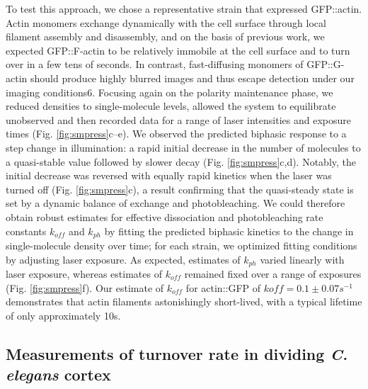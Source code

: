 To test this approach, we chose a representative strain that expressed GFP::actin. Actin monomers exchange dynamically with the cell surface through local filament assembly and disassembly, and on the basis of previous work, we expected GFP::F-actin to be relatively immobile at the cell surface and to turn over in a few tens of seconds. In contrast, fast-diffusing monomers of GFP::G-actin should produce highly blurred images and thus escape detection under our imaging conditions6. Focusing again on the polarity maintenance phase, we reduced densities to single-molecule levels, allowed the system to equilibrate unobserved and then recorded data for a range of laser intensities and exposure times (Fig. \ref{fig:smpress}c–e). We observed the predicted biphasic response to a step change in illumination: a rapid initial decrease in the number of molecules to a quasi-stable value followed by slower decay (Fig. \ref{fig:smpress}c,d). Notably, the initial decrease was reversed with equally rapid kinetics when the laser was turned off (Fig. \ref{fig:smpress}c), a result confirming that the quasi-steady state is set by a dynamic balance of exchange and photobleaching. We could therefore obtain robust estimates for effective dissociation and photobleaching rate constants $k_{off}$ and $k_{ph}$ by fitting the predicted biphasic kinetics to the change in single-molecule density over time; for each strain, we optimized fitting conditions by adjusting laser exposure. As expected, estimates of $k_{ph}$ varied linearly with laser exposure, whereas estimates of $k_{off}$ remained fixed over a range of exposures (Fig. \ref{fig:smpress}f). Our estimate of $k_{off}$ for actin::GFP of $koff = 0.1 ± 0.07 s^{−1}$ demonstrates that actin filaments astonishingly short-lived, with a typical lifetime of only approximately 10s.



\subsection{Measurements of turnover rate in dividing \textit{C. elegans} cortex}




